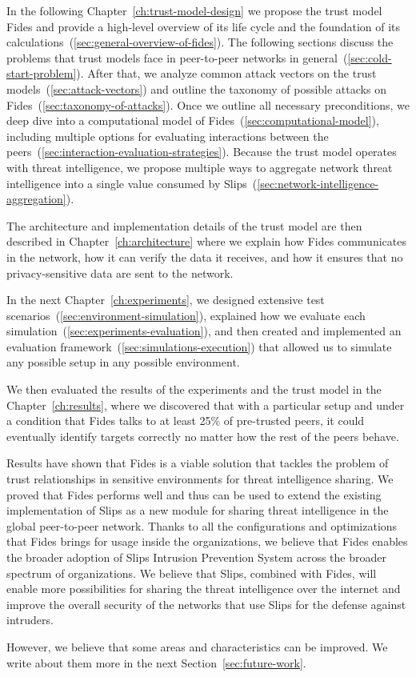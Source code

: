 In the following Chapter~\ref{ch:trust-model-design} we propose the trust model Fides and provide a high-level overview of its life cycle and the foundation of its calculations~(\ref{sec:general-overview-of-fides}).
The following sections discuss the problems that trust models face in peer-to-peer networks in general~(\ref{sec:cold-start-problem}).
After that, we analyze common attack vectors on the trust models~(\ref{sec:attack-vectors}) and outline the taxonomy of possible attacks on Fides~(\ref{sec:taxonomy-of-attacks}).
Once we outline all necessary preconditions, we deep dive into a computational model of Fides~(\ref{sec:computational-model}), including multiple options for evaluating interactions between the peers~(\ref{sec:interaction-evaluation-strategies}).
Because the trust model operates with threat intelligence, we propose multiple ways to aggregate network threat intelligence into a single value consumed by Slips~(\ref{sec:network-intelligence-aggregation}).

The architecture and implementation details of the trust model are then described in Chapter~\ref{ch:architecture} where we explain how Fides communicates in the network, how it can verify the data it receives, and how it ensures that no privacy-sensitive data are sent to the network.

In the next Chapter~\ref{ch:experiments}, we designed extensive test scenarios~(\ref{sec:environment-simulation}), explained how we evaluate each simulation~(\ref{sec:experiments-evaluation}), and then created and implemented an evaluation framework~(\ref{sec:simulations-execution}) that allowed us to simulate any possible setup in any possible environment.

We then evaluated the results of the experiments and the trust model in the Chapter~\ref{ch:results}, where we discovered that with a particular setup and under a condition that Fides talks to at least 25\% of pre-trusted peers, it could eventually identify targets correctly no matter how the rest of the peers behave.

Results have shown that Fides is a viable solution that tackles the problem of trust relationships in sensitive environments for threat intelligence sharing. 
We proved that Fides performs well and thus can be used to extend the existing implementation of Slips as a new module for sharing threat intelligence in the global peer-to-peer network.
Thanks to all the configurations and optimizations that Fides brings for usage inside the organizations, we believe that Fides enables the broader adoption of Slips Intrusion Prevention System across the broader spectrum of organizations.
We believe that Slips, combined with Fides, will enable more possibilities for sharing the threat intelligence over the internet and improve the overall security of the networks that use Slips for the defense against intruders.

However, we believe that some areas and characteristics can be improved. We write about them more in the next Section~\ref{sec:future-work}.

